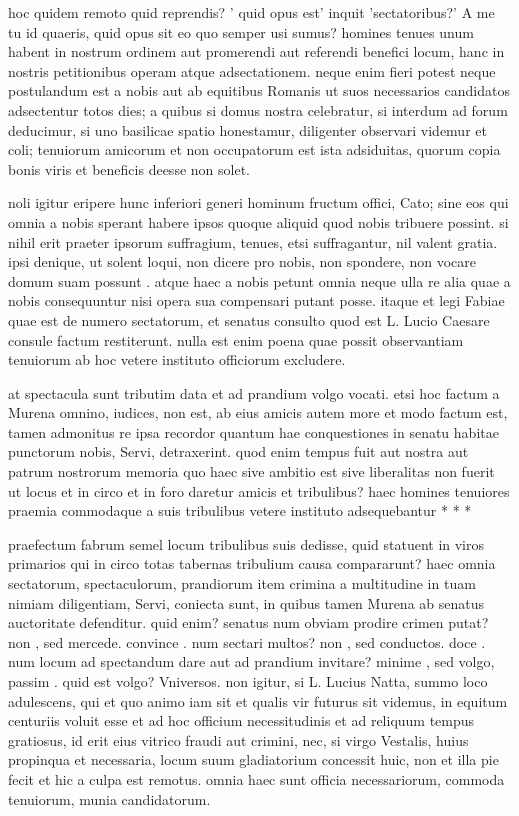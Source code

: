  hoc quidem remoto quid reprendis? ' quid opus est' inquit 'sectatoribus?' A me tu id quaeris, quid opus sit eo quo semper usi sumus? homines tenues unum habent in nostrum ordinem aut promerendi aut referendi benefici locum, hanc in nostris petitionibus operam atque adsectationem. neque enim fieri potest neque postulandum est a nobis aut ab equitibus Romanis ut suos necessarios candidatos adsectentur totos dies; a quibus si domus nostra celebratur, si interdum ad forum deducimur, si uno basilicae spatio honestamur, diligenter observari videmur et coli; tenuiorum amicorum et non occupatorum est ista adsiduitas, quorum copia bonis viris et beneficis deesse non solet.

 noli igitur eripere hunc inferiori generi hominum fructum offici, Cato; sine eos qui omnia a nobis sperant habere ipsos quoque aliquid quod nobis tribuere possint. si nihil erit praeter ipsorum suffragium, tenues, etsi suffragantur, nil valent gratia. ipsi denique, ut solent loqui, non dicere pro nobis, non spondere, non vocare domum suam possunt . atque haec a nobis petunt omnia neque ulla re alia quae a nobis consequuntur nisi opera sua compensari putant posse. itaque et legi Fabiae quae est de numero sectatorum, et senatus consulto quod est L. Lucio Caesare consule factum restiterunt. nulla est enim poena quae possit observantiam tenuiorum ab hoc vetere instituto officiorum excludere.

 at spectacula sunt tributim data et ad prandium volgo vocati. etsi hoc factum a Murena omnino, iudices, non est, ab eius amicis autem more et modo factum est, tamen admonitus re ipsa recordor quantum hae conquestiones in senatu habitae punctorum nobis, Servi, detraxerint. quod enim tempus fuit aut nostra aut patrum nostrorum memoria quo haec sive ambitio est sive liberalitas non fuerit ut locus et in circo et in foro daretur amicis et tribulibus? haec homines tenuiores praemia commodaque a suis tribulibus vetere instituto adsequebantur * * *

 praefectum fabrum semel locum tribulibus suis dedisse, quid statuent in viros primarios qui in circo totas tabernas tribulium causa compararunt? haec omnia sectatorum, spectaculorum, prandiorum item crimina a multitudine in tuam nimiam diligentiam, Servi, coniecta sunt, in quibus tamen Murena ab senatus auctoritate defenditur. quid enim? senatus num obviam prodire crimen putat? non , sed mercede. convince . num sectari multos? non , sed conductos. doce . num locum ad spectandum dare aut ad prandium invitare? minime , sed volgo, passim . quid est volgo? Vniversos. non igitur, si L. Lucius Natta, summo loco adulescens, qui et quo animo iam sit et qualis vir futurus sit videmus, in equitum centuriis voluit esse et ad hoc officium necessitudinis et ad reliquum tempus gratiosus, id erit eius vitrico fraudi aut crimini, nec, si virgo Vestalis, huius propinqua et necessaria, locum suum gladiatorium concessit huic, non et illa pie fecit et hic a culpa est remotus. omnia haec sunt officia necessariorum, commoda tenuiorum, munia candidatorum.

